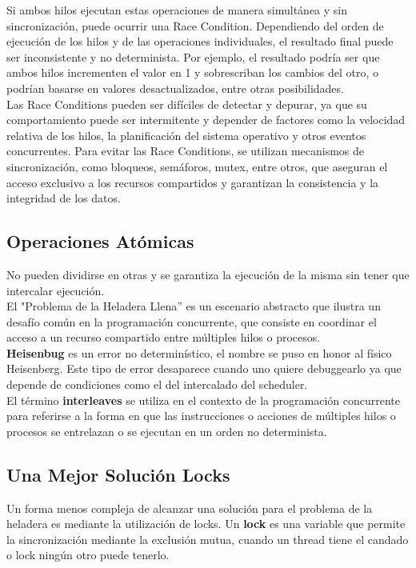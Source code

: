 \documentclass[../main.tex]{subfiles}
\begin{document}
            Si ambos hilos ejecutan estas operaciones de manera simultánea y sin sincronización, puede ocurrir una Race Condition. Dependiendo del orden de ejecución de los hilos y de las operaciones individuales, el resultado final puede ser inconsistente y no determinista. Por ejemplo, el resultado podría ser que ambos hilos incrementen el valor en 1 y sobrescriban los cambios del otro, o podrían basarse en valores desactualizados, entre otras posibilidades.\\

            Las Race Conditions pueden ser difíciles de detectar y depurar, ya que su comportamiento puede ser intermitente y depender de factores como la velocidad relativa de los hilos, la planificación del sistema operativo y otros eventos concurrentes. Para evitar las Race Conditions, se utilizan mecanismos de sincronización, como bloqueos, semáforos, mutex, entre otros, que aseguran el acceso exclusivo a los recursos compartidos y garantizan la consistencia y la integridad de los datos.

        \subsection{Operaciones Atómicas}
            No pueden dividirse en otras y se garantiza la ejecución de la misma sin tener que intercalar ejecución.\\

            El "Problema de la Heladera Llena” es un escenario abstracto que ilustra un desafío común en la programación concurrente, que consiste en coordinar el acceso a un recurso compartido entre múltiples hilos o procesos.\\

            \textbf{Heisenbug} es un error no determinístico, el nombre se puso en honor al físico Heisenberg. Este tipo de error desaparece cuando uno quiere debuggearlo ya que depende de condiciones como el del intercalado del scheduler.\\

            El término \textbf{interleaves} se utiliza en el contexto de la programación concurrente para referirse a la forma en que las instrucciones o acciones de múltiples hilos o procesos se entrelazan o se ejecutan en un orden no determinista.

    \subsection{Una Mejor Solución Locks}
        Un forma menos compleja de alcanzar una solución para el problema de la heladera es mediante la utilización de locks. Un \textbf{lock} es una variable que permite la sincronización mediante la exclusión mutua, cuando un thread tiene el candado o lock ningún otro puede tenerlo.\\
\end{document}
